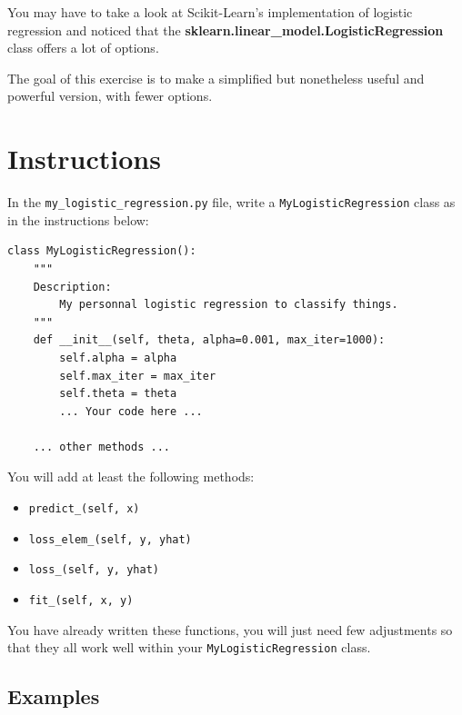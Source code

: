 \documentclass{42-en}
\begin{document}
You may have to take a look at Scikit-Learn's implementation of logistic regression and noticed that the \textbf{sklearn.linear\_model.LogisticRegression} class offers a lot of options.

The goal of this exercise is to make a simplified but nonetheless useful and powerful version, with fewer options.

\section*{Instructions}
In the \texttt{my\_logistic\_regression.py} file, write a \texttt{MyLogisticRegression} class as in the instructions below:

\begin{verbatim}
class MyLogisticRegression():
	"""
	Description:
		My personnal logistic regression to classify things.
	"""
    def __init__(self, theta, alpha=0.001, max_iter=1000):
        self.alpha = alpha
        self.max_iter = max_iter
        self.theta = theta
        ... Your code here ...

	... other methods ...
\end{verbatim}

You will add at least the following methods:
\begin{itemize}
  \item \texttt{predict\_(self, x)}
  \item \texttt{loss\_elem\_(self, y, yhat)}
  \item \texttt{loss\_(self, y, yhat)}
  \item \texttt{fit\_(self, x, y)}
\end{itemize}

You have already written these functions, you will just need few adjustments so that they all work well within your \texttt{MyLogisticRegression} class.

\subsection*{Examples}
\end{document}
